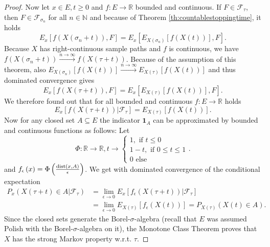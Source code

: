 \documentclass[12pt,a4paper]{scrartcl}
\numberwithin{equation}{section}
\newcommand{\R}{\mathbb{R}} %
\newcommand{\N}{\mathbb{N}} %
\begin{document}
\begin{proof}
Now let $x \in E, t\geq 0$ and $f:E \to \R$ bounded and continuous. If $F \in \mathcal{F}_{\tau}$, then $F \in \mathcal{F}_{\sigma_n}$ for all $n \in \N$ and because of Theorem \ref{th:countablestoppingtime}, it holds
$$ E_x\left[ f\left(X\left(\sigma_n + t \right) \right), F \right] = E_x\left[E_{X\left(\sigma_n\right)}\left[f\left(X\left(t\right) \right) \right], F \right].$$
Because $X$ has right-continuous sample paths and $f$ is continuous, we have $f\left(X\left(\sigma_n + t \right) \right) \overset{n \to \infty}{\to} f\left(X\left(\tau + t \right) \right)$. Because of the assumption of this theorem, also $E_{X\left(\sigma_n\right)}\left[f\left(X\left(t\right) \right) \right] \overset{n \to \infty}{\to} E_{X\left(\tau\right)}\left[f\left(X\left(t\right) \right) \right]$ and thus dominated convergence gives 
$$ E_x\left[ f\left(X\left(\tau + t \right) \right), F \right] = E_x\left[E_{X\left(\tau\right)}\left[f\left(X\left(t\right) \right) \right], F \right].$$
We therefore found out that for all bounded and continuous $f:E \to \R$ holds
$$ E_x\left[ f\left(X\left(\tau + t \right) \right)  |\mathcal{F}_{\tau}\right] = E_{X\left(\tau \right)}\left[f\left(X\left(t\right)\right) \right].$$
Now for any closed set $ A \subseteq E $ the indicator $\textbf{1}_{A}$ can be approximated by bounded and continuous functions as follows: Let $$\Phi: \R \to \R, t \to \begin{cases} 1, \mbox{ if } t \leq 0 \\1-t, \mbox{ if } 0 \leq t \leq 1 \\0 \mbox{ else }   \end{cases}.$$
and $f_{\epsilon}\left(x\right) = \Phi\left( \frac{ \textnormal{dist}\left(x,A\right)}{\epsilon} \right)$. We get with dominated convergence of the conditional expectation
\begin{align*}
P_x\left(X\left(\tau + t \right) \in A | \mathcal{F}_{\tau}\right) &= \lim_{\epsilon \to 0} E_x\left[ f_{\epsilon}\left(X\left(\tau + t\right) \right) | \mathcal{F}_{\tau}\right] \\
&= \lim_{\epsilon \to 0} E_{X\left(\tau\right)} \left[f_{\epsilon}\left(X\left(t\right) \right) \right] = P_{X\left(\tau \right)}\left(X\left(t\right) \in A \right).
\end{align*}
Since the closed sets generate the Borel-$\sigma$-algebra (recall that $E$ was assumed Polish with the Borel-$\sigma$-algebra on it), the Monotone Class Theorem proves that $X$ has the strong Markov property w.r.t. $\tau$.
\end{proof}
\end{document}
